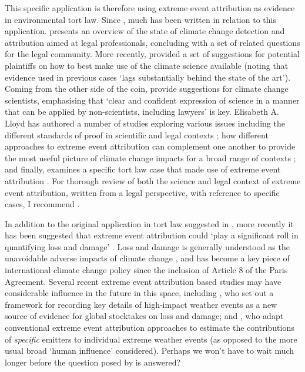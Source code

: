   This specific application is therefore using extreme event attribution as evidence in environmental tort law. Since \citet{allen_liability_2003}, much has been written in relation to this application. \citet{allen_scientific_2007} presents an overview of the state of climate change detection and attribution aimed at legal professionals, concluding with a set of related questions for the legal community. More recently, \citet{stuart-smith_filling_2021} provided a set of suggestions for potential plaintiffs on how to best make use of the climate science available (noting that evidence used in previous cases `lags substantially behind the state of the art'). Coming from the other side of the coin, \citet{marjanac_acts_2017} provide suggestions for climate change scientists, emphasising that `clear and confident expression of science in a manner that can be applied by non-scientists, including lawyers' is key. Elisabeth A. Lloyd has authored a number of studies exploring various issues including the different standards of proof in scientific and legal contexts \citep{lloyd_climate_2021}; how different approaches to extreme event attribution can complement one another to provide the most useful picture of climate change impacts for a broad range of contexts \citep{lloyd_climate_2018,lloyd_environmental_2020}; and finally, examines a specific tort law case that made use of extreme event attribution \citep{lloyd_climate_2021-1}. For thorough review of both the science and legal context of extreme event attribution, written from a legal perspective, with reference to specific cases, I recommend \citet{burger_law_2020,marjanac_extreme_2018}.
  
  In addition to the original application in tort law suggested in \citet{allen_liability_2003}, more recently it has been suggested that extreme event attribution could `play a significant roll in quantifying loss and damage' \citep{wehner_operational_2022}. Loss and damage is generally understood as the unavoidable adverse impacts of climate change \citep{mace_loss_2016}, and has become a key piece of international climate change policy since the inclusion of Article 8 of the Paris Agreement. Several recent extreme event attribution based studies may have considerable influence in the future in this space, including \citet{clarke_inventories_2021}, who set out a framework for recording key details of high-impact weather events as a new source of evidence for global stocktakes on loss and damage; and \citet{otto_assigning_2017,lott_quantifying_2021}, who adapt conventional extreme event attribution approaches to estimate the contributions of \emph{specific} emitters to individual extreme weather events (as opposed to the more usual broad `human influence' considered). Perhaps we won't have to wait much longer before the question posed by \citeauthor{allen_liability_2003} is answered?

